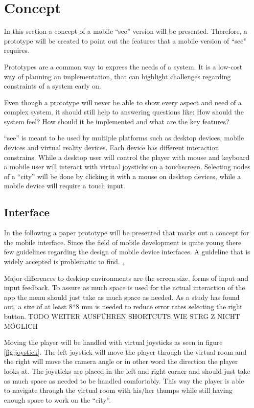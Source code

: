 \section{Concept}
In this section a concept of a mobile \enquote{\gls{see}} version will be presented. 
Therefore, a prototype will be created to point out the features that a mobile version of \enquote{\gls{see}} requires.

Prototypes are a common way to express the needs of a system. 
It is a low-cost way of planning an implementation, that can highlight challenges regarding constraints of a system early on.

Even though a prototype will never be able to show every aspect and need of a complex system, it should still help to answering questions like: 
How should the system feel? How should it be implemented and what are the key features? \cite{houde1997prototypes} 

\enquote{\gls{see}} is meant to be used by multiple platforms such as desktop devices, mobile devices and virtual reality devices.
Each device has different interaction constrains. 
While a desktop user will control the player with mouse and keyboard a mobile user will interact with virtual joysticks on a touchscreen.
Selecting nodes of a \enquote{\gls{city}} will be done by clicking it with a mouse on desktop devices, while a mobile device will require a touch input.

\subsection{Interface}

In the following a paper prototype will be presented that marks out a concept for the mobile interface.
Since the field of mobile development is quite young there few guidelines regarding the design of mobile device interfaces.
A guideline that is widely accepted is problematic to find. \cite{renaud2017demarcating}, \cite{punchoojit2017usability}

Major differences to desktop environments are the screen size, forms of input and input feedback.
To assure as much space is used for the actual interaction of the app the menu should just take as much space as needed.
As a study has found out, a size of at least 8*8 mm is needed to reduce error rates selecting the right button. \cite{conradi2015optimal}
TODO WEITER AUSFÜHREN
SHORTCUTS WIE STRG Z NICHT MÖGLICH
 \cite{adipat2005interface} 

Moving the player will be handled with virtual joysticks as seen in figure \ref{fig:joystick}.
The left joystick will move the player through the virtual room and the right will move the camera angle or in other word the direction the player looks at.
The joysticks are placed in the left and right corner and should just take as much space as needed to be handled comfortably.
This way the player is able to navigate through the virtual room with his/her thumps while still having enough space to work on the \enquote{\gls{city}}.

